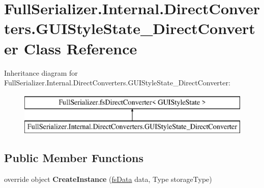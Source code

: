 \hypertarget{class_full_serializer_1_1_internal_1_1_direct_converters_1_1_g_u_i_style_state___direct_converter}{}\section{Full\+Serializer.\+Internal.\+Direct\+Converters.\+G\+U\+I\+Style\+State\+\_\+\+Direct\+Converter Class Reference}
\label{class_full_serializer_1_1_internal_1_1_direct_converters_1_1_g_u_i_style_state___direct_converter}
Inheritance diagram for Full\+Serializer.\+Internal.\+Direct\+Converters.\+G\+U\+I\+Style\+State\+\_\+\+Direct\+Converter\+:\begin{figure}[H]
\begin{center}
\leavevmode
\includegraphics[height=2.000000cm]{class_full_serializer_1_1_internal_1_1_direct_converters_1_1_g_u_i_style_state___direct_converter}
\end{center}
\end{figure}
\subsection*{Public Member Functions}
\begin{DoxyCompactItemize}
\item 
\mbox{\label{class_full_serializer_1_1_internal_1_1_direct_converters_1_1_g_u_i_style_state___direct_converter_a11870a07fd7aade8717b1764137d9dbb}} 
override object {\bfseries Create\+Instance} (\hyperlink{class_full_serializer_1_1fs_data}{fs\+Data} data, Type storage\+Type)
\end{DoxyCompactItemize}
